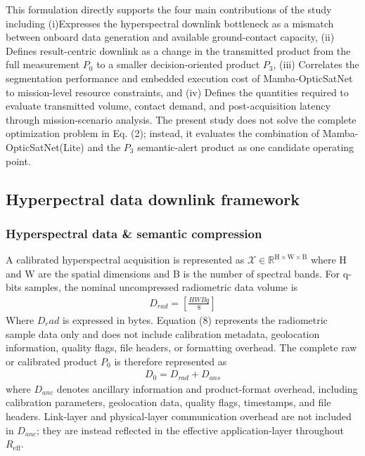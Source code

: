 \documentclass[a4paper,fleqn]{cas-dc}
\begin{document}
This formulation directly supports the four main contributions of the study including (i)Expresses the hyperspectral downlink bottleneck as a mismatch between onboard data generation and available ground-contact capacity, (ii) Defines result-centric downlink as a change in the transmitted product from the full measurement \(P_0\) to a smaller decision-oriented product \(P_3\), (iii) Correlates the segmentation performance and embedded execution cost of Mamba-OpticSatNet to mission-level resource constraints, and (iv) Defines the quantities required to evaluate transmitted volume, contact demand, and post-acquisition latency through mission-scenario analysis. The present study does not solve the complete optimization problem in Eq. (2); instead, it evaluates the combination of Mamba-OpticSatNet(Lite) and the \(P_3\) semantic-alert product as one candidate operating point.
\subsection{Hyperpectral data downlink framework}\label{sec:framework}
\subsubsection{Hyperspectral data \& semantic compression}
A calibrated hyperspectral acquisition is represented as \(\mathcal{X} \in \mathbb{R}^{\mathrm{H\times W \times B}}\) where H and W are the spatial dimensions and B is the number of spectral bands. For q-bits samples, the nominal uncompressed radiometric data volume is
\begin{eqnarray}
	D_{rad} = \left[\frac{HWBq}{8}\right]
\end{eqnarray}
Where \(D_rad\)  is expressed in bytes. Equation (8) represents the radiometric sample data only and does not include calibration metadata, geolocation information, quality flags, file headers, or formatting overhead.
The complete raw or calibrated product \(P_0\) is therefore represented as
\begin{eqnarray}
	D_0 = D_{rad} + D_{ans}
\end{eqnarray}
where \(D_{anc}\) denotes ancillary information and product-format overhead, including calibration parameters, geolocation data, quality flags, timestamps, and file headers. Link-layer and physical-layer communication overhead are not included in \(D_{anc}\); they are instead reflected in the effective application-layer throughout \(R_\mathrm{eff}\).
\end{document}
